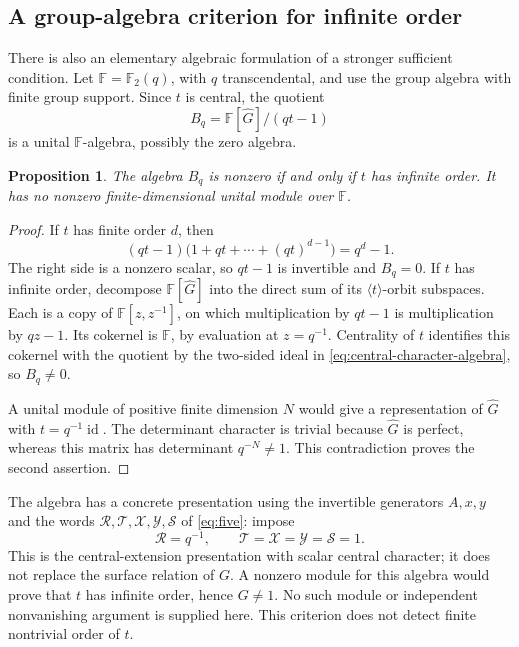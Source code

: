 \documentclass[11pt]{amsart}
\newtheorem{proposition}[theorem]{Proposition}
\theoremstyle{definition}
\theoremstyle{remark}
\newcommand{\Ftwo}{\mathbb F_2}
\begin{document}
\subsection*{A group-algebra criterion for infinite order}
There is also an elementary algebraic formulation of a stronger
sufficient condition. Let $\mathbb F=\Ftwo(q)$, with $q$
transcendental, and use the group algebra with finite group support.
Since $t$ is central, the quotient
\begin{equation}\label{eq:central-character-algebra}
             B_q=\mathbb F[\widehat G]/(qt-1)
\end{equation}
is a unital $\mathbb F$-algebra, possibly the zero algebra.

\begin{proposition}\label{prop:central-character-algebra}
The algebra $B_q$ is nonzero if and only if $t$ has infinite order.
It has no nonzero finite-dimensional unital module over $\mathbb F$.
\end{proposition}
\begin{proof}
If $t$ has finite order $d$, then
\[
 (qt-1)\bigl(1+qt+\cdots+(qt)^{d-1}\bigr)=q^d-1.
\]
The right side is a nonzero scalar, so $qt-1$ is invertible and
$B_q=0$. If $t$ has infinite order, decompose
$\mathbb F[\widehat G]$ into the direct sum of its
$\langle t\rangle$-orbit subspaces. Each is a copy of
$\mathbb F[z,z^{-1}]$, on which multiplication by $qt-1$
is multiplication by $qz-1$. Its cokernel is $\mathbb F$,
by evaluation at $z=q^{-1}$. Centrality of $t$ identifies this
cokernel with the quotient by the two-sided ideal in
\eqref{eq:central-character-algebra}, so $B_q\ne0$.

A unital module of positive finite dimension $N$ would give a
representation of $\widehat G$ with $t=q^{-1}\operatorname{id}$.
The determinant character is trivial because $\widehat G$ is
perfect, whereas this matrix has determinant $q^{-N}\ne1$.
This contradiction proves the second assertion.
\end{proof}

The algebra has a concrete presentation using the invertible
generators $A,x,y$ and the words
$\mathcal R,\mathcal T,\mathcal X,\mathcal Y,\mathcal S$ of
\eqref{eq:five}: impose
\[
 \mathcal R=q^{-1},\qquad
 \mathcal T=\mathcal X=\mathcal Y=\mathcal S=1.
\]
This is the central-extension presentation with scalar central
character; it does not replace the surface relation of $G$.
A nonzero module for this algebra would prove that $t$ has
infinite order, hence $G\ne1$. No such module or independent
nonvanishing argument is supplied here. This criterion does not
detect finite nontrivial order of $t$.
\end{document}
